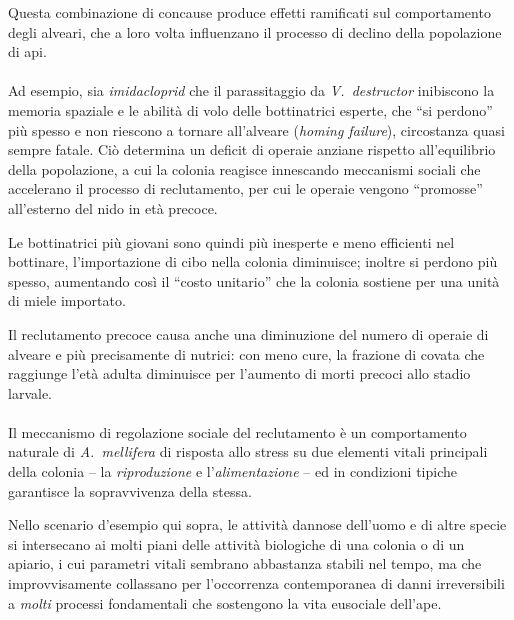 Questa combinazione di concause produce effetti ramificati sul comportamento degli alveari, che a loro volta influenzano il processo di declino della popolazione di api.

\paragraph{}
Ad esempio, sia \emph{imidacloprid} che il parassitaggio da \emph{V.~destructor} inibiscono la memoria spaziale e le abilità di volo delle bottinatrici esperte, che ``si perdono'' più spesso e non riescono a tornare all'alveare (\emph{homing failure}), circostanza quasi sempre fatale. Ciò determina un deficit di operaie anziane rispetto all'equilibrio della popolazione, a cui la colonia reagisce innescando meccanismi sociali che accelerano il processo di reclutamento, per cui le operaie vengono ``promosse'' all'esterno del nido in età precoce.

Le bottinatrici più giovani sono quindi più inesperte e meno efficienti nel bottinare, l'importazione di cibo nella colonia diminuisce; inoltre si perdono più spesso, aumentando così il ``costo unitario'' che la colonia sostiene per una unità di miele importato.

Il reclutamento precoce causa anche una diminuzione del numero di operaie di alveare e più precisamente di nutrici:
con meno cure, la frazione di covata che raggiunge l'età adulta diminuisce per l'aumento di morti precoci allo stadio larvale.

\paragraph{}
\label{par:socialRecr}
Il meccanismo di regolazione sociale del reclutamento è un comportamento naturale di \emph{A.~mellifera}
di risposta allo stress su due elementi vitali principali della colonia -- la \emph{riproduzione} e l'\emph{alimentazione} -- ed in condizioni tipiche garantisce la sopravvivenza della stessa.

Nello scenario d'esempio qui sopra, le attività dannose dell'uomo e di altre specie si intersecano ai molti piani delle attività biologiche di una colonia o di un apiario, i cui parametri vitali sembrano abbastanza stabili nel tempo, ma che improvvisamente collassano per l'occorrenza contemporanea di danni irreversibili a \emph{molti} processi fondamentali che sostengono la vita eusociale dell'ape.

